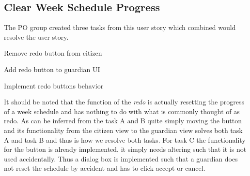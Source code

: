 \subsection{Clear Week Schedule Progress}
\begin{center}
\end{center}
The PO group created three tasks from this user story which combined would resolve the user story.
\begin{eletterate}
    \item Remove redo button from citizen
    \item Add redo button to guardian UI
    \item Implement redo buttons behavior
\end{eletterate}
It should be noted that the function of the \textit{redo} is actually resetting the progress of a week schedule and has nothing to do with what is commonly thought of as redo.
As can be inferred from the task A and B quite simply moving the button and its functionality from the citizen view to the guardian view solves both task A and task B and thus is how we resolve both tasks.
For task C the functionality for the button is already implemented, it simply needs altering such that it is not used accidentally.
Thus a dialog box is implemented such that a guardian does not reset the schedule by accident and has to click accept or cancel.
